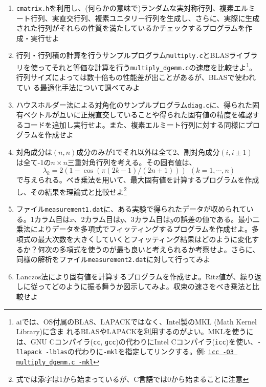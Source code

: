 \documentclass[11pt]{jarticle}
\begin{document}
\begin{enumerate}
  \hspace*{-2em} {\bf [対角化]}
    
\item {\tt cmatrix.h}を利用し、(何らかの意味で)ランダムな実対称行列、複素エルミート行列、実直交行列、複素ユニタリー行列を生成し、さらに、実際に生成された行列がそれらの性質を満たしているかチェックするプログラムを作成・実行せよ

  \item 行列・行列積の計算を行うサンプルプログラム{\tt multiply.c}とBLASライブラリを使ってそれと等価な計算を行う{\tt multiply\_dgemm.c}の速度を比較せよ\footnote{aiでは、OS付属のBLAS、LAPACKではなく、Intel製のMKL (Math Kernel Library)に含ま
れるBLASやLAPACKを利用するのがよい。MKLを使うには、GNU Cコンパイラ({\tt cc}, {\tt gcc})の代わりにIntel Cコンパイラ({\tt icc})を使い、{\tt -llapack -lblas}の代わりに{\tt -mkl}を指定してリンクする。例: \underline{\tt icc -O3 multiply\_dgemm.c -mkl}}。行列サイズによっては数十倍もの性能差が出ことがあるが、BLASで使われてい
る最適化手法について調べてみよ

\item ハウスホルダー法による対角化のサンプルプログラム{\tt diag.c}に、得られた固有ベクトルが互いに正規直交していることや得られた固有値の精度を確認するコードを追加し実行せよ。また、複素エルミート行列に対する同様にプログラムを作成せよ

  \item 対角成分は$(n,n)$成分のみが1でそれ以外は全て2、副対角成分$(i, i \pm 1)$
は全て-1の$n \times n$三重対角行列を考える。その固有値は、
    \[ \lambda_k = 2 (1 - \cos (\pi (2 k - 1) / (2 n + 1))) \ \ (k=1,\cdots,n)\]
    で与えられる。べき乗法を用いて、最大固有値を計算するプログラムを作成し、その結果を理論式と比較せよ\footnote{式では添字は1から始まっているが、C言語では0から始まることに注意}

  \item ファイル{\tt measurement1.dat}に、ある実験で得られたデータが収められている。1カラム目は$x$、2カラム目は$y$、3カラム目は$y$の誤差の値である。最小二乗法によりデータを多項式でフィッティングするプログラムを作成せよ。多項式の最大次数を大きくしていくとフィッティング結果はどのように変化するか？何次の多項式を使うのが最も良いと考えられるか考察せよ。さらに、同様の解析をファイル{\tt measurement2.dat}に対して行ってみよ

  \item Lanczos法により固有値を計算するプログラムを作成せよ。Ritz値が、繰り返しに従ってどのように振る舞うか図示してみよ。収束の速さをべき乗法と比較せよ


\end{enumerate}
\end{document}
